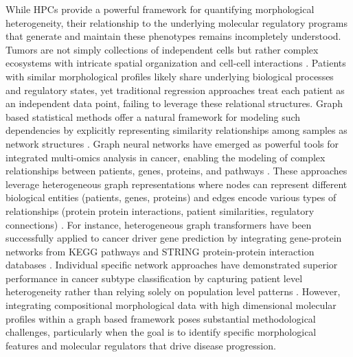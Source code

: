 \documentclass[pdflatex,article,12pt]{article}
\begin{document}
While HPCs provide a powerful framework for quantifying morphological heterogeneity, their relationship to the underlying molecular regulatory programs that generate and maintain these phenotypes remains incompletely understood. Tumors are not simply collections of independent cells but rather complex ecosystems with intricate spatial organization and cell-cell interactions \cite{tlsty2006tumor,hanahan2000hallmarks}. Patients with similar morphological profiles likely share underlying biological processes and regulatory states, yet traditional regression approaches treat each patient as an independent data point, failing to leverage these relational structures. Graph based statistical methods offer a natural framework for modeling such dependencies by explicitly representing similarity relationships among samples as network structures \cite{gogoshin2023graph,valous2024graph}. Graph neural networks have emerged as powerful tools for integrated multi-omics analysis in cancer, enabling the modeling of complex relationships between patients, genes, proteins, and pathways \cite{gogoshin2023graph,li2024multimodal,peng2023identifying}. These approaches leverage heterogeneous graph representations where nodes can represent different biological entities (patients, genes, proteins) and edges encode various types of relationships (protein protein interactions, patient similarities, regulatory connections) \cite{ozcan2025gnnmutation,chatzianastasis2023explainable,li2024multimodal}. For instance, heterogeneous graph transformers have been successfully applied to cancer driver gene prediction by integrating gene-protein networks from KEGG pathways and STRING protein-protein interaction databases \cite{duan2024heterogeneous}. Individual specific network approaches have demonstrated superior performance in cancer subtype classification by capturing patient level heterogeneity rather than relying solely on population level patterns \cite{ayyoubzadeh2023graph}. However, integrating compositional morphological data with high dimensional molecular profiles within a graph based framework poses substantial methodological challenges, particularly when the goal is to identify specific morphological features and molecular regulators that drive disease progression.
\end{document}

